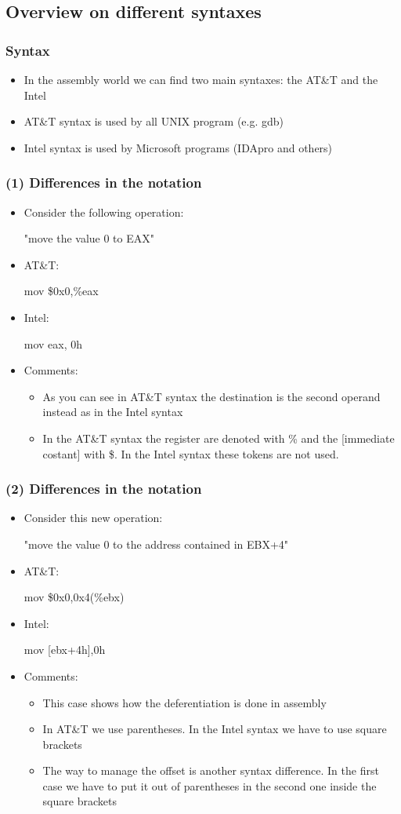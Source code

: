 \documentclass[]{beamer}
\begin{document}
	\subsection{Overview on different syntaxes}
		\begin{frame}
			\frametitle{Syntax}
			\begin{itemize}
				\item{In the assembly world we can find two main syntaxes: the AT\&T and the Intel}
				\item{AT\&T syntax is used by all UNIX program (e.g. gdb)}
				\item{Intel syntax is used by Microsoft programs (IDApro and others)}
			\end{itemize}
		\end{frame}
		\begin{frame}
			\frametitle{(1) Differences in the notation}
			\begin{itemize}
				\item{Consider the following operation:\newline\centerline{"move the value 0 to EAX"}}
				\item{AT\&T: \centerline{ mov \$0x0,\%eax} }
				\item{Intel: \centerline{ mov eax, 0h}}
				\item{Comments:} 
				\begin{itemize}
					\item{As you can see in AT\&T syntax the destination is the second operand instead as in the Intel syntax}
					\item{In the AT\&T syntax the register are denoted with \% and the [immediate \textpipe{} costant] with \$. In the Intel syntax these tokens are not used. }
				\end{itemize}
			\end{itemize}
		\end{frame}
		\begin{frame}
			\frametitle{(2) Differences in the notation}
			\begin{itemize}
				\item{Consider this new operation:\newline\centerline {"move the value 0 to the address contained in EBX+4"}}
				\item{AT\&T: \centerline{ mov \$0x0,0x4(\%ebx)}}
				\item{Intel: \centerline{ mov [ebx+4h],0h }}
				\item{Comments:}
				\begin{itemize}
					\item{This case shows how  the deferentiation is done in assembly}
					\item{In AT\&T we use parentheses. In the Intel syntax we have to use square brackets}
					\item{The way to manage the offset is another syntax difference. In the first case we have to put it out of parentheses in the second one inside the square brackets }
				\end{itemize}
			\end{itemize}
		\end{frame}
\end{document}
